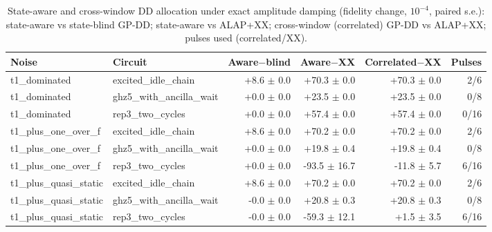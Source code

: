 \begin{table}[t]
\centering
\caption{State-aware and cross-window DD allocation under exact amplitude damping (fidelity change, $10^{-4}$, paired s.e.): state-aware vs state-blind GP-DD; state-aware vs ALAP+XX; cross-window (correlated) GP-DD vs ALAP+XX; pulses used (correlated/XX).}\label{tab:c5b}
\footnotesize
\begin{adjustbox}{max width=0.95\textwidth}
\begin{tabular}{llrrrr}
\toprule
Noise & Circuit & Aware$-$blind & Aware$-$XX & Correlated$-$XX & Pulses \\
\midrule
t1\_dominated & excited\_idle\_chain & +8.6 $\pm$ 0.0 & +70.3 $\pm$ 0.0 & +70.3 $\pm$ 0.0 & 2/6 \\
t1\_dominated & ghz5\_with\_ancilla\_wait & +0.0 $\pm$ 0.0 & +23.5 $\pm$ 0.0 & +23.5 $\pm$ 0.0 & 0/8 \\
t1\_dominated & rep3\_two\_cycles & +0.0 $\pm$ 0.0 & +57.4 $\pm$ 0.0 & +57.4 $\pm$ 0.0 & 0/16 \\
t1\_plus\_one\_over\_f & excited\_idle\_chain & +8.6 $\pm$ 0.0 & +70.2 $\pm$ 0.0 & +70.2 $\pm$ 0.0 & 2/6 \\
t1\_plus\_one\_over\_f & ghz5\_with\_ancilla\_wait & +0.0 $\pm$ 0.0 & +19.8 $\pm$ 0.4 & +19.8 $\pm$ 0.4 & 0/8 \\
t1\_plus\_one\_over\_f & rep3\_two\_cycles & +0.0 $\pm$ 0.0 & -93.5 $\pm$ 16.7 & -11.8 $\pm$ 5.7 & 6/16 \\
t1\_plus\_quasi\_static & excited\_idle\_chain & +8.6 $\pm$ 0.0 & +70.2 $\pm$ 0.0 & +70.2 $\pm$ 0.0 & 2/6 \\
t1\_plus\_quasi\_static & ghz5\_with\_ancilla\_wait & -0.0 $\pm$ 0.0 & +20.8 $\pm$ 0.3 & +20.8 $\pm$ 0.3 & 0/8 \\
t1\_plus\_quasi\_static & rep3\_two\_cycles & -0.0 $\pm$ 0.0 & -59.3 $\pm$ 12.1 & +1.5 $\pm$ 3.5 & 6/16 \\
\bottomrule
\end{tabular}
\end{adjustbox}
\end{table}
